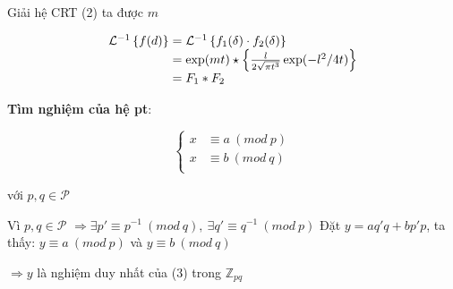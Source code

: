 \documentclass[12pt]{article}
\begin{document}
Giải hệ CRT (2) ta được $m$

\begin{equation*}
\begin{array}{l@{}l}
\mathcal{L}^{-1}\left\{f(d)\right\} 
    &{}= \mathcal{L}^{-1}\left\{f_1(\delta) \cdot f_2(\delta)\right\} \\
    &{}= \exp(mt) \star \left\{\frac{l}{2\sqrt{\pi t^3}} \exp(-l^2/{4t})\right\} \\
    &{}= F_1 * F_2
\end{array}
\end{equation*}

\vskip 0.2in
\textbf{Tìm nghiệm của hệ pt}:

\begin{equation}\label{sequations:abs-crt}
\begin{cases}
x &\equiv a\ (mod\ p) \\
x &\equiv b\ (mod\ q) \\
\end{cases}
\end{equation}
\begin{center}
với $p,q\in \mathcal{P}$
\end{center}

Vì $p,q\in \mathcal{P}$ $\Rightarrow \exists p'\equiv p^{-1}\ (mod\ q),\ \exists q'\equiv q^{-1}\ (mod\ p)$
\vskip 0.2in
Đặt $y=aq'q + bp'p$, ta thấy: $y \equiv a\ (mod\ p)$ và  $y \equiv b\ (mod\ q)$

$\Rightarrow y$ là nghiệm duy nhất của (3) trong $\mathbb{Z}_{pq}$
\end{document}

